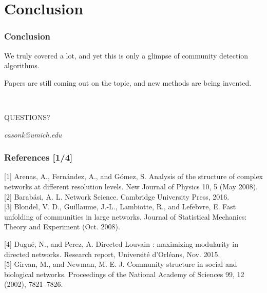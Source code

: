 \documentclass{beamer}
\newcommand{\XB}{\color{black}}
\newcommand{\XR}{\color{red}}
\begin{document}

\section{Conclusion}

\begin{frame}
    \frametitle{Conclusion}

    We truly covered a lot, and yet this is only a glimpse of community detection algorithms.\pause

    \vspace{2.5mm}
    Papers are still coming out on the topic, and new methods are being invented.\pause

    \hrulefill \\
    \Large{\centerline{\XR QUESTIONS?\XB}}
    \normalsize{\centerline{\textit{casonk@umich.edu}}}

\end{frame}

\begin{frame}
    \frametitle{References [1/4]}

    [1] Arenas, A., Fern{\'{a}}ndez, A., and G{\'{o}}mez, S.
    Analysis of the structure of complex networks at
    different resolution levels. New Journal of Physics 10, 5
    (May 2008). \\

    [2] Barab{\'{a}}si, A. L. Network Science. Cambridge
    University Press, 2016. \\

    [3] Blondel, V. D., Guillaume, J.-L., Lambiotte, R.,
    and Lefebvre, E. Fast unfolding of communities in
    large networks. Journal of Statistical Mechanics: Theory
    and Experiment (Oct. 2008).

    [4] Dugu{\'{e}}, N., and Perez, A. Directed Louvain :
    maximizing modularity in directed networks. Research
    report, Universit{\'{e}} d'Orl{\'{e}}ans, Nov. 2015. \\

    [5] Girvan, M., and Newman, M. E. J. Community
    structure in social and biological networks. Proceedings
    of the National Academy of Sciences 99, 12 (2002),
    7821–7826.

\end{frame}
\end{document}
